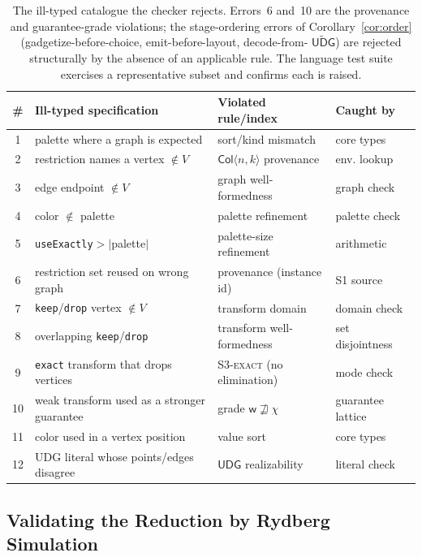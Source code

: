 \documentclass[11pt]{article}
\theoremstyle{definition}
\theoremstyle{remark}
\newcommand{\tCol}{\mathsf{Col}}
\newcommand{\tUDG}{\mathsf{UDG}}
\newcommand{\tUDGa}{\widetilde{\mathsf{UDG}}}
\newcommand{\rn}[1]{\textsc{\footnotesize #1}}
\begin{document}
\begin{table}[h]
\centering
\small
\begin{tabular}{@{}clll@{}}
\toprule
\# & Ill-typed specification & Violated rule/index & Caught by \\
\midrule
1  & palette where a graph is expected      & sort/kind mismatch        & core types \\
2  & restriction names a vertex $\notin V$  & $\tCol\langle n,k\rangle$ provenance & env. lookup \\
3  & edge endpoint $\notin V$               & graph well-formedness     & graph check \\
4  & color $\notin$ palette                 & palette refinement        & palette check \\
5  & \texttt{useExactly}$>|$palette$|$      & palette-size refinement   & arithmetic \\
6  & restriction set reused on wrong graph  & provenance (instance id)  & \rn{S1} source \\
7  & \texttt{keep}/\texttt{drop} vertex $\notin V$ & transform domain   & domain check \\
8  & overlapping \texttt{keep}/\texttt{drop} & transform well-formedness & set disjointness \\
9  & \texttt{exact} transform that drops vertices & \rn{S3-exact} (no elimination) & mode check \\
10 & weak transform used as a stronger guarantee & grade $\mathsf{w}\not\sqsupseteq\chi$ & guarantee lattice \\
11 & color used in a vertex position        & value sort                & core types \\
12 & UDG literal whose points/edges disagree & $\tUDG$ realizability     & literal check \\
\bottomrule
\end{tabular}
\caption{The ill-typed catalogue the checker rejects. Errors~6 and~10 are the
provenance and guarantee-grade violations; the stage-ordering errors of
Corollary~\ref{cor:order} (gadgetize-before-choice, emit-before-layout, decode-from-
$\tUDGa$) are rejected structurally by the absence of an applicable rule. The
language test suite exercises a representative subset and confirms each is raised.}
\label{tab:errors}
\end{table}

\subsection{Validating the Reduction by Rydberg Simulation}
\label{sec:simval}
\end{document}

